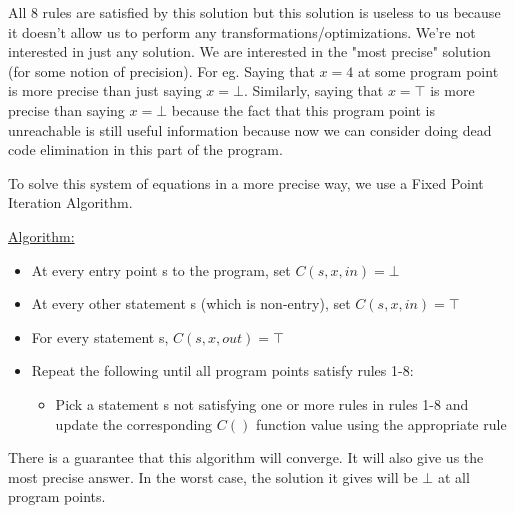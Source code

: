 All 8 rules are satisfied by this solution but this solution is useless to us because it doesn't allow us to perform any transformations/optimizations. We're not interested in just any solution. We are interested in the "most precise" solution (for some notion of precision). For eg. Saying that $x=4$ at some program point is more precise than just saying $x=\bot$. Similarly, saying that $x=\top$ is more precise than saying $x=\bot$ because the fact that this program point is unreachable is still useful information because now we can consider doing dead code elimination in this part of the program.

\vspace{0.3cm}

To solve this system of equations in a more precise way, we use a Fixed Point Iteration Algorithm.

\vspace{0.3cm}

\underline{Algorithm:}

\vspace{0.3cm}

\begin{itemize}
    \item At every entry point s to the program, set $C(s, x, in) = \bot$
    \item At every other statement s (which is non-entry), set $C(s,x,in) = \top$
    \item For every statement s, $C(s,x,out) = \top$
    \item Repeat the following until all program points satisfy rules 1-8:
    \begin{itemize}
        \item Pick a statement s not satisfying one or more rules in rules 1-8 and update the corresponding $C()$ function value using the appropriate rule
    \end{itemize}
\end{itemize}

There is a guarantee that this algorithm will converge. It will also give us the most precise answer. In the worst case, the solution it gives will be $\bot$ at all program points.

